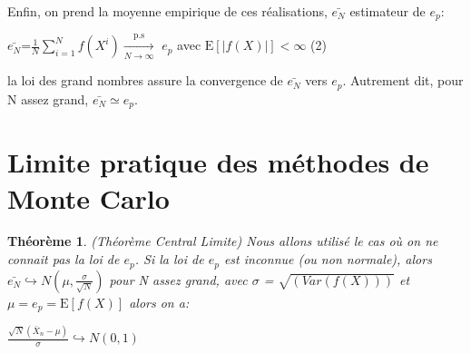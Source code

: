 \documentclass[12pt]{report}
\newtheorem{theo}{Théorème}[section]
\begin{document}
Enfin, on prend la moyenne empirique de ces réalisations, $\bar{e_N}$ estimateur de $e_p$:\newline
\begin{center}
	$\bar{e_N}$=$\frac{1}{N}\sum_{i=1}^{N} f(X^i) \xrightarrow[N\rightarrow{\infty}]{\text{p.s}}$
	$e_p$ \hspace{1cm}avec $\text{E}[|f(X)|]<\infty$ \hspace{1cm} (2)\newline
\end{center}
la loi des grand nombres assure la convergence de $\bar{e_N}$ vers $e_p$.
Autrement dit, pour N assez grand, $\bar{e_N} \simeq e_p$.

\section{Limite pratique des méthodes de Monte Carlo}

\begin{theo}
	\emph{(Théorème Central Limite)}
	\label{TCL}\newline
	Nous allons utilisé le cas où on ne connait pas la loi de $e_p$.
	Si la loi de $e_p$ est inconnue (ou non normale), alors $\bar{e_N}\hookrightarrow N(\mu,\frac{\sigma}{\sqrt{N}})$ pour N assez grand, avec $\sigma$ = $\sqrt{(Var(f(X)))}$  et $\mu=e_p =\text{E}[f(X)]$  alors on a:
	\begin{center}
		$\frac{\sqrt{N}(\bar{X}_n-\mu)}{\sigma}\hookrightarrow N(0,1)$
	\end{center}
\end{theo}
\end{document}
